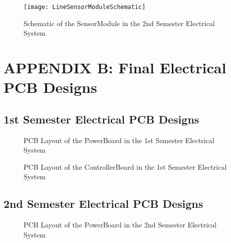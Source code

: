     \begin{figure}[H]
      \begin{center}
        \texttt{[image: LineSensorModuleSchematic]}
        \caption{Schematic of the SensorModule in the 2nd Semester Electrical System}
        \label{fig:LineSensorModuleSchematic}
      \end{center}
    \end{figure}

\clearpage
\section{APPENDIX B: Final Electrical PCB Designs}
\label{sec:APPENDIX B: Final Electrical PCB Designs}
  \subsection{1st Semester Electrical PCB Designs}
  \label{sub:1st Semester Electrical PCB Designs}

    \begin{figure}[H]
      \begin{center}
        \caption{PCB Layout of the PowerBoard in the 1st Semester Electrical System}
        \label{fig:PowerBoardPCBRev1}
      \end{center}
    \end{figure}

    \begin{figure}[H]
      \begin{center}
        \caption{PCB Layout of the ControllerBoard in the 1st Semester Electrical System}
        \label{fig:ControllerBoardPCB}
      \end{center}
    \end{figure}

  \subsection{2nd Semester Electrical PCB Designs}
  \label{sub:2nd Semester Electrical PCB Designs}

    \begin{figure}[H]
      \begin{center}
        \caption{PCB Layout of the PowerBoard in the 2nd Semester Electrical System}
        \label{fig:PowerBoardPCBV2}
      \end{center}
    \end{figure}

